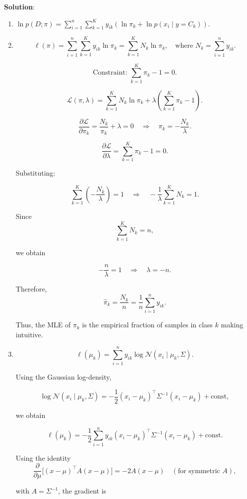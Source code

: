 \documentclass[submit]{harvardml}
\newenvironment{solution}{
    \vspace{2mm}
    \color{blue}\noindent\textbf{Solution}:
}{}
\begin{document}
\begin{solution}
	\begin{enumerate}
	    \item $\ln p(D;\pi)
=
\sum_{i=1}^{n}
\sum_{k=1}^{K}
y_{ik}
\left(
\ln \pi_k
+
\ln p(x_i \mid y = C_k)
\right).$
\item \[
\ell(\pi)
=
\sum_{i=1}^{n}
\sum_{k=1}^{K}
y_{ik} \ln \pi_k
=
\sum_{k=1}^{K}
N_k \ln \pi_k,
\quad
\text{where }
N_k = \sum_{i=1}^{n} y_{ik}.
\]

\[
\text{Constraint: }
\sum_{k=1}^{K} \pi_k - 1 = 0.
\]

\[
\mathcal{L}(\pi,\lambda)
=
\sum_{k=1}^{K} N_k \ln \pi_k
+
\lambda
\left(
\sum_{k=1}^{K} \pi_k - 1
\right).
\]

\[
\frac{\partial \mathcal{L}}{\partial \pi_k}
=
\frac{N_k}{\pi_k}
+
\lambda
= 0
\quad
\Rightarrow
\quad
\pi_k
=
-\frac{N_k}{\lambda}.
\]

\[
\frac{\partial \mathcal{L}}{\partial \lambda}
=
\sum_{k=1}^{K} \pi_k - 1
= 0.
\]

Substituting:

\[
\sum_{k=1}^{K}
\left(
-\frac{N_k}{\lambda}
\right)
=
1
\quad
\Rightarrow
\quad
-\frac{1}{\lambda}
\sum_{k=1}^{K} N_k
=
1.
\]

Since
\[
\sum_{k=1}^{K} N_k = n,
\]

we obtain

\[
-\frac{n}{\lambda} = 1
\quad
\Rightarrow
\quad
\lambda = -n.
\]

Therefore,
\[
\hat{\pi}_k
=
\frac{N_k}{n}
=
\frac{1}{n}
\sum_{i=1}^{n} y_{ik}.
\]


Thus, the MLE of  $\pi_k$ is the empirical fraction of samples in class  $k$ making intuitive.
\item \[
\ell(\mu_k)
=
\sum_{i=1}^{n}
y_{ik}\log \mathcal{N}(x_i \mid \mu_k,\Sigma).
\]

Using the Gaussian log-density,

\[
\log \mathcal{N}(x_i \mid \mu_k,\Sigma)
=
-\frac{1}{2}
(x_i-\mu_k)^\top \Sigma^{-1} (x_i-\mu_k)
+ \text{const},
\]

we obtain

\[
\ell(\mu_k)
=
-\frac{1}{2}
\sum_{i=1}^{n}
y_{ik}
(x_i-\mu_k)^\top \Sigma^{-1} (x_i-\mu_k)
+ \text{const}.
\]

Using the identity
\[
\frac{\partial}{\partial \mu}
\big[(x-\mu)^\top A (x-\mu)\big]
=
-2A(x-\mu)
\quad (\text{for symmetric }A),
\]

with \(A=\Sigma^{-1}\), the gradient is


\end{enumerate}
\end{solution}
\end{document}
